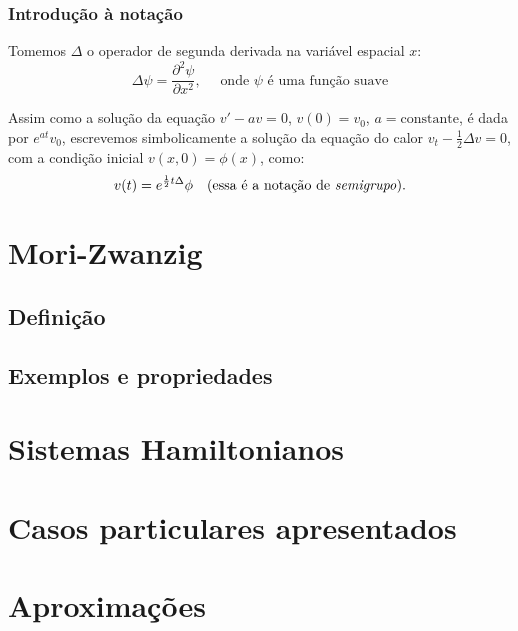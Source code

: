 \documentclass[12pt]{article}
\begin{document}
\subsubsection{Introdução à notação}
Tomemos $\Delta$ o operador de segunda derivada na variável espacial $x$: 
\begin{equation*}
    \Delta\psi = \frac{\partial^2 \psi}{\partial x^2}, \quad \text{ onde $\psi$ é uma função suave}
\end{equation*}

Assim como a solução da equação $v' - av = 0$, $v(0) = v_0$, $a = \text{constante}$, é dada por $e^{at}v_0$, escrevemos simbolicamente a solução da equação do calor $v_t - \frac{1}{2}\Delta v = 0$, com a condição inicial $v(x, 0) = \phi(x)$, como:
\begin{equation*}
    v(t) = e^{\frac{1}{2}t\Delta}\phi \quad \text{(essa é a notação de \textit{semigrupo})}.
\end{equation*}


\section{Mori-Zwanzig}
\subsection{Definição}
\subsection{Exemplos e propriedades}

\appendix
\section{Sistemas Hamiltonianos}

\section{Casos particulares apresentados}

\section{Aproximações}
\newpage
\nocite{*}
\printbibliography
\end{document}

